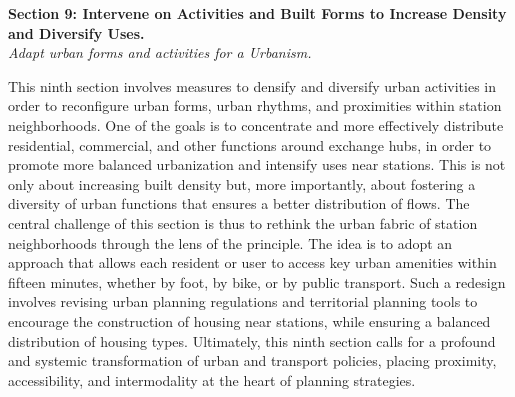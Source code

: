 \begin{refsegment}
    \begin{displayquote}
\textbf{Section 9: Intervene on Activities and Built Forms to Increase Density and Diversify Uses.}
\\
\textsl{Adapt urban forms and activities for a  Urbanism.}
    \end{displayquote}
This ninth section involves measures to densify and diversify urban activities in order to reconfigure urban forms, urban rhythms, and proximities within station neighborhoods. One of the goals is to concentrate and more effectively distribute residential, commercial, and other functions around exchange hubs, in order to promote more balanced urbanization and intensify uses near stations. This is not only about increasing built density but, more importantly, about fostering a diversity of urban functions that ensures a better distribution of flows. The central challenge of this section is thus to rethink the urban fabric of station neighborhoods through the lens of the  principle. The idea is to adopt an approach that allows each resident or user to access key urban amenities within fifteen minutes, whether by foot, by bike, or by public transport. Such a redesign involves revising urban planning regulations and territorial planning tools to encourage the construction of housing near stations, while ensuring a balanced distribution of housing types. Ultimately, this ninth section calls for a profound and systemic transformation of urban and transport policies, placing proximity, accessibility, and intermodality at the heart of planning strategies.%


\end{refsegment}

